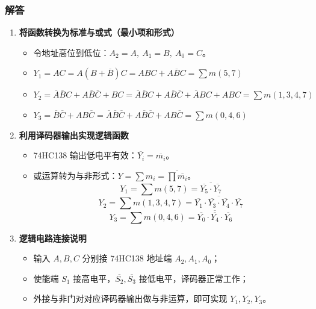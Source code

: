 \subsubsection{解答}
\begin{enumerate}
    \item \textbf{将函数转换为标准与或式（最小项和形式）}
    \begin{itemize}
        \item 令地址高位到低位：$A_2=A,\ A_1=B,\ A_0=C$。
        \item $Y_1 = AC = A(B+\overline{B})C = ABC + A\overline{B}C = \sum m(5,7)$
        \item $Y_2 = \overline{A}\overline{B}C + A\overline{B}\overline{C} + BC
        = \overline{A}\overline{B}C + A\overline{B}\overline{C} + \overline{A}BC + ABC
        = \sum m(1,3,4,7)$
        \item $Y_3 = \overline{B}\overline{C} + AB\overline{C}
        = \overline{A}\overline{B}\overline{C} + A\overline{B}\overline{C} + AB\overline{C}
        = \sum m(0,4,6)$
    \end{itemize}

    \item \textbf{利用译码器输出实现逻辑函数}
    \begin{itemize}
        \item 74HC138 输出低电平有效：$\overline{Y_i} = \overline{m_i}$。
        \item 或运算转为与非形式：$\displaystyle Y=\sum m_i = \overline{\prod \overline{m_i}}$。
        \[
        Y_1 = \sum m(5,7) = \overline{\overline{Y_5} \cdot \overline{Y_7}}
        \]
        \[
        Y_2 = \sum m(1,3,4,7) = \overline{\overline{Y_1} \cdot \overline{Y_3} \cdot \overline{Y_4} \cdot \overline{Y_7}}
        \]
        \[
        Y_3 = \sum m(0,4,6) = \overline{\overline{Y_0} \cdot \overline{Y_4} \cdot \overline{Y_6}}
        \]
    \end{itemize}

    \item \textbf{逻辑电路连接说明}
    \begin{itemize}
        \item 输入 $A,B,C$ 分别接 74HC138 地址端 $A_2,A_1,A_0$；
        \item 使能端 $S_1$ 接高电平，$\overline{S_2},\overline{S_3}$ 接低电平，译码器正常工作；
        \item 外接与非门对对应译码器输出做与非运算，即可实现 $Y_1,Y_2,Y_3$。
    \end{itemize}
\end{enumerate}

